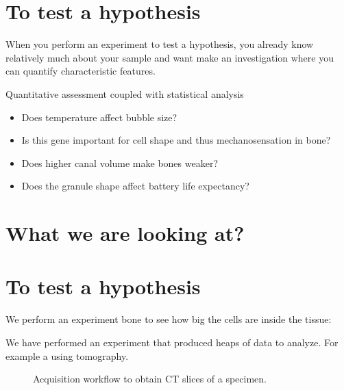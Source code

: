 \documentclass[letterpaper,10pt,english]{sphinxmanual}
\begin{document}
\section{To test a hypothesis}
\label{\detokenize{04-BasicSegmentation:to-test-a-hypothesis}}
\sphinxAtStartPar
When you perform an experiment to test a hypothesis, you already know relatively much about your sample and want make an investigation where you can quantify characteristic features.

\sphinxAtStartPar
Quantitative assessment coupled with statistical analysis
\begin{itemize}
\item {} 
\sphinxAtStartPar
Does temperature affect bubble size?

\item {} 
\sphinxAtStartPar
Is this gene important for cell shape and thus mechanosensation in bone?

\item {} 
\sphinxAtStartPar
Does higher canal volume make bones weaker?

\item {} 
\sphinxAtStartPar
Does the granule shape affect battery life expectancy?

\end{itemize}


\section{What we are looking at?}
\label{\detokenize{04-BasicSegmentation:what-we-are-looking-at}}



\section{To test a hypothesis}
\label{\detokenize{04-BasicSegmentation:id1}}
\sphinxAtStartPar
We perform an experiment bone to see how big the cells are inside the tissue:

\sphinxAtStartPar
We have performed an experiment that produced heaps of data to analyze. For example a using tomography.

\begin{figure}[htbp]
\centering
\capstart

\noindent{}
\caption{Acquisition workflow to obtain CT slices of a specimen.}\label{\detokenize{04-BasicSegmentation:id3}}\end{figure}
\end{document}
